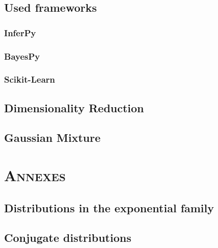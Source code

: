 \documentclass[twoside,openright,titlepage,numbers=noenddot,openany,headinclude,footinclude=true, cleardoublepage=empty,abstractoff,BCOR=5mm,paper=a4,fontsize=11pt, dvipsnames]{scrreprt}
\begin{document}
\chapter{Used frameworks}

\section{InferPy}

\section{BayesPy}

\section{Scikit-Learn}


\chapter{Dimensionality Reduction}


\chapter{Gaussian Mixture}



\ctparttext{
  \color{black}
  \begin{center}

  \end{center}
}
\part*{\textsc{Annexes}}

\appendix
\chapter{Distributions in the exponential family}\label{ap:exp_fam}


\chapter{Conjugate distributions}\label{ap:conj_distr}



\clearpage

\printglossary[title={\textsc{notation}}]
\glsaddallunused

\clearpage
\nocite{*}


\end{document}
